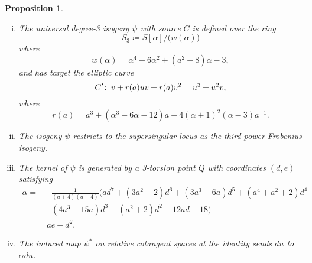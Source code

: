 \documentclass{gtpart}
\newtheorem{prop}[thm]{Proposition}
\theoremstyle{definition}
\theoremstyle{remark}
\def\co{\colon\thinspace}
\newcommand{\A}{\alpha}
\begin{document}
\begin{prop}
\label{prop:isog}
 \mbox{}
 \begin{enumerate}[(i)]
  \item The universal degree-3 isogeny $\psi$ with source $C$ is defined over the ring 
  \[
   S_3 \coloneqq S[\A] \big/ \big( w(\A) \big) 
  \]
  where 
  \[
   w(\A) = \A^4 - 6 \A^2 + (a^2 - 8) \A - 3, 
  \]
  and has target the elliptic curve 
  \[
   C' \co v + r(a) u v + r(a) v^2 = u^3 + u^2 v, 
  \]
  where 
  \[
   r(a) = a^3 + (\A^3 - 6 \A - 12) a - 4 (\A + 1)^2 (\A - 3) a^{-1}.  
  \]

  \item The isogeny $\psi$ restricts to the supersingular locus as the third-power Frobenius isogeny.  

  \item The kernel of $\psi$ is generated by a 3-torsion point $Q$ with coordinates $(d,e)$ satisfying 
  \begin{equation}
  \label{A}
  \begin{split}
   \A = & -\frac{1}{(a + 4) (a - 4)} \big(a d^7 + (3 a^2 - 2) d^6 + (3 a^3 - 6 a) d^5 + (a^4 + a^2 + 2) d^4 \\
        & + (4 a^3 - 15 a) d^3 + (a^2 + 2) d^2 - 12 a d -18\big) \\
      = & ~ a e - d^2.  
  \end{split}
  \end{equation}

  \item The induced map $\psi^*$ on relative cotangent spaces at the identity sends $du$ to $\A du$.  
 \end{enumerate}
\end{prop}
\end{document}
